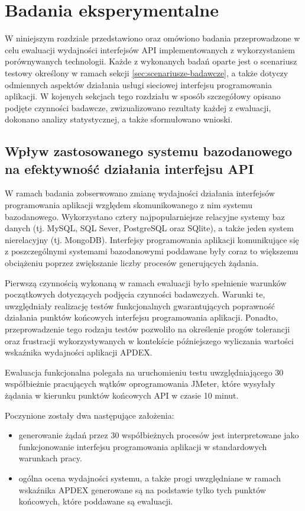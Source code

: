 \chapter{Badania eksperymentalne}
W niniejszym rozdziale przedstawiono oraz omówiono badania przeprowadzone w celu ewaluacji wydajności interfejsów API implementowanych z wykorzystaniem porównywanych technologii. Każde z wykonanych badań oparte jest o scenariusz testowy określony w ramach sekcji \ref{sec:scenariusze-badawcze}, a także dotyczy odmiennych aspektów działania usługi sieciowej interfejsu programowania aplikacji. W kojenych sekcjach tego rozdziału w sposób szczegółowy opisano podjęte czynności badawcze, zwizualizowano rezultaty każdej z ewaluacji, dokonano analizy statystycznej, a także sformułowano wnioski.

\section{Wpływ zastosowanego systemu bazodanowego na efektywność działania interfejsu API}
\label{research:crud}
W ramach badania zobserwowano zmianę wydajności działania interfejsów programowania aplikacji względem skomunikowanego z nim systemu bazodanowego. Wykorzystano cztery najpopularniejsze relacyjne systemy baz danych (tj. MySQL, SQL Sever, PostgreSQL oraz SQlite), a także jeden system nierelacyjny (tj. MongoDB). Interfejsy programowania aplikacji komunikujące się z poszczególnymi systemami bazodanowymi poddawane były coraz to większemu obciążeniu poprzez zwiększanie liczby procesów generujących żądania.

Pierwszą czynnością wykonaną w ramach ewaluacji było spełnienie warunków początkowych dotyczących podjęcia czynności badawczych. Warunki te, uwzględniały realizację testów funkcjonalnych gwarantujących poprawność działania punktów końcowych interfejsu programowania aplikacji. Ponadto, przeprowadzenie tego rodzaju testów pozwoliło na określenie progów tolerancji oraz frustracji wykorzystywanych w kontekście późniejszego wyliczania wartości wskaźnika wydajności aplikacji APDEX.

Ewaluacja funkcjonalna polegała na uruchomieniu testu uwzględniającego 30 współbieżnie pracujących wątków oprogramowania JMeter, które wysyłały żądania w kierunku punktów końcowych API w czasie 10 minut.

Poczynione zostały dwa następujące założenia:
\begin{itemize}
    \item generowanie żądań przez 30 współbieżnych procesów jest interpretowane jako funkcjonowanie interfejsu programowania aplikacji w standardowych warunkach pracy.
    \item ogólna ocena wydajności systemu, a także progi uwzględniane w ramach wskaźnika APDEX generowane są na podstawie tylko tych punktów końcowych, które poddawane są ewaluacji.
\end{itemize}

